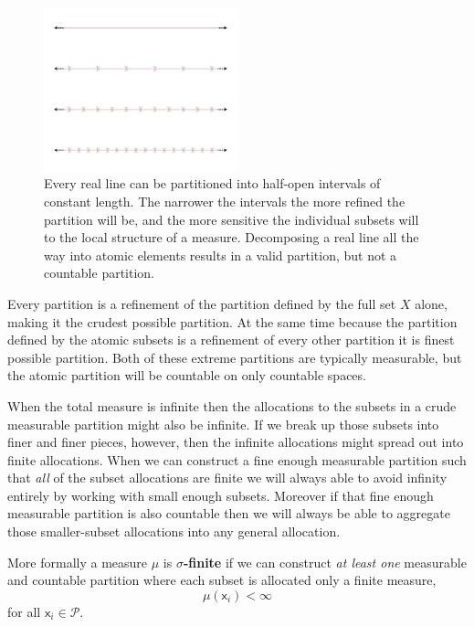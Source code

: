\documentclass[
  letterpaper,
  DIV=11,
  numbers=noendperiod]{scrartcl}
\begin{document}
\begin{figure}

{\centering \includegraphics[width=0.5\textwidth,height=\textheight]{figures/partition_refinements/partition_refinements.pdf}

}

\caption{\label{fig-partition-refinements}Every real line can be
partitioned into half-open intervals of constant length. The narrower
the intervals the more refined the partition will be, and the more
sensitive the individual subsets will to the local structure of a
measure. Decomposing a real line all the way into atomic elements
results in a valid partition, but not a countable partition.}

\end{figure}

Every partition is a refinement of the partition defined by the full set
\(X\) alone, making it the crudest possible partition. At the same time
because the partition defined by the atomic subsets is a refinement of
every other partition it is finest possible partition. Both of these
extreme partitions are typically measurable, but the atomic partition
will be countable on only countable spaces.

When the total measure is infinite then the allocations to the subsets
in a crude measurable partition might also be infinite. If we break up
those subsets into finer and finer pieces, however, then the infinite
allocations might spread out into finite allocations. When we can
construct a fine enough measurable partition such that \emph{all} of the
subset allocations are finite we will always able to avoid infinity
entirely by working with small enough subsets. Moreover if that fine
enough measurable partition is also countable then we will always be
able to aggregate those smaller-subset allocations into any general
allocation.

More formally a measure \(\mu\) is \textbf{\(\sigma\)-finite} if we can
construct \emph{at least one} measurable and countable partition where
each subset is allocated only a finite measure, \[
\mu(\mathsf{x}_{i}) < \infty
\] for all \(\mathsf{x}_{i} \in \mathcal{P}\).
\end{document}
